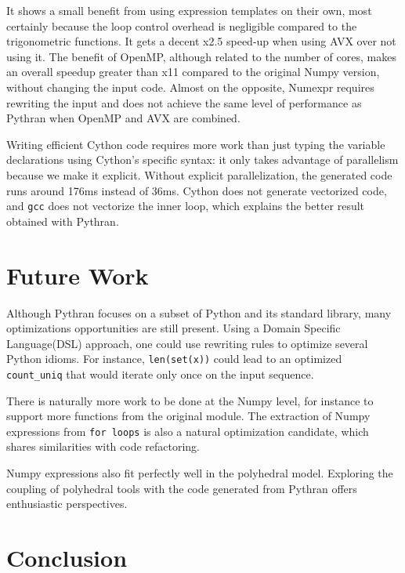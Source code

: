 \documentclass[10pt, onecolumn, preprint]{sigplanconf}
\begin{document}
It shows a small benefit from using expression templates on their own, most
certainly because the loop control overhead is negligible compared to the
trigonometric functions. It gets a decent x2.5 speed-up when using AVX over not
using it. The benefit of OpenMP, although related to the number of cores, makes
an overall speedup greater than x11 compared to the original Numpy version, 
without
changing the input code. Almost on the opposite, Numexpr requires rewriting the 
input and does not achieve the same level of performance as Pythran when OpenMP
and AVX are combined.

Writing efficient Cython code requires more work than just typing the variable
declarations using Cython's specific syntax: it only takes advantage of
parallelism because we make it explicit. Without explicit parallelization,
the generated code runs around 176ms instead of 36ms. %
Cython does not generate
vectorized code, and \texttt{gcc} does not vectorize the inner loop, which 
explains the better result obtained with Pythran.

\section{Future Work}

Although Pythran focuses on a subset of Python and its standard library, many
optimizations opportunities are still present. Using a Domain Specific
Language(DSL) approach, one could use rewriting rules to optimize several
Python idioms. For instance, \texttt{len(set(x))} could lead to an optimized
\texttt{count\_uniq} that would iterate only once on the input sequence.

There is naturally more work to be done at the Numpy level, for instance to
support more functions from the original module. The extraction of Numpy
expressions from \texttt{for loops} is also a natural optimization candidate, which
shares similarities with code refactoring.

Numpy expressions also fit perfectly well in the polyhedral model. Exploring
the coupling of polyhedral tools with the code generated from Pythran offers
enthusiastic perspectives.

\section{Conclusion}
\end{document}

